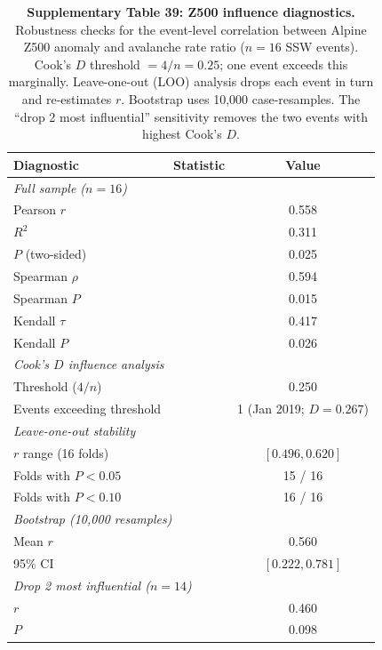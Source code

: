 \documentclass[11pt,letterpaper]{article}
\begin{document}
\begin{table}[!ht]
\centering
\caption{\textbf{Supplementary Table 39: Z500 influence diagnostics.}
Robustness checks for the event-level correlation between Alpine Z500 anomaly and avalanche rate ratio ($n = 16$ SSW events).
Cook's $D$ threshold $= 4/n = 0.25$; one event exceeds this marginally.
Leave-one-out (LOO) analysis drops each event in turn and re-estimates $r$.
Bootstrap uses 10,000 case-resamples.
The ``drop 2 most influential'' sensitivity removes the two events with highest Cook's $D$.}
\label{tab:z500_diag}
\small
\begin{tabular}{llc}
\toprule
Diagnostic & Statistic & Value \\
\midrule
\multicolumn{3}{l}{\textit{Full sample ($n = 16$)}} \\
Pearson $r$ & & 0.558 \\
$R^2$ & & 0.311 \\
$P$ (two-sided) & & 0.025 \\
Spearman $\rho$ & & 0.594 \\
Spearman $P$ & & 0.015 \\
Kendall $\tau$ & & 0.417 \\
Kendall $P$ & & 0.026 \\
\midrule
\multicolumn{3}{l}{\textit{Cook's $D$ influence analysis}} \\
Threshold ($4/n$) & & 0.250 \\
Events exceeding threshold & & 1 (Jan 2019; $D = 0.267$) \\
\midrule
\multicolumn{3}{l}{\textit{Leave-one-out stability}} \\
$r$ range (16 folds) & & $[0.496, 0.620]$ \\
Folds with $P < 0.05$ & & 15 / 16 \\
Folds with $P < 0.10$ & & 16 / 16 \\
\midrule
\multicolumn{3}{l}{\textit{Bootstrap (10,000 resamples)}} \\
Mean $r$ & & 0.560 \\
95\% CI & & $[0.222, 0.781]$ \\
\midrule
\multicolumn{3}{l}{\textit{Drop 2 most influential ($n = 14$)}} \\
$r$ & & 0.460 \\
$P$ & & 0.098 \\
\bottomrule
\end{tabular}
\end{table}
\end{document}
